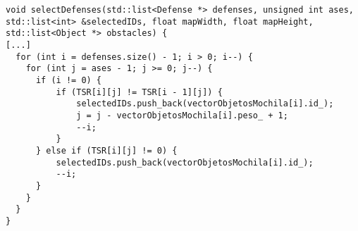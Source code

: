 \begin{lstlisting}
void selectDefenses(std::list<Defense *> defenses, unsigned int ases, std::list<int> &selectedIDs, float mapWidth, float mapHeight, std::list<Object *> obstacles) {
[...]
  for (int i = defenses.size() - 1; i > 0; i--) {
    for (int j = ases - 1; j >= 0; j--) {
      if (i != 0) {
          if (TSR[i][j] != TSR[i - 1][j]) {
              selectedIDs.push_back(vectorObjetosMochila[i].id_);
              j = j - vectorObjetosMochila[i].peso_ + 1;
              --i;
          }
      } else if (TSR[i][j] != 0) {
          selectedIDs.push_back(vectorObjetosMochila[i].id_);
          --i;
      }
    }
  }
}
\end{lstlisting}